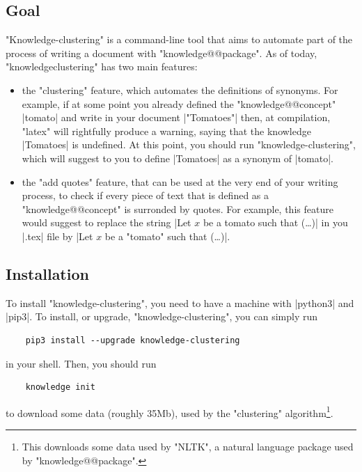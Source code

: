 \documentclass{article}
\begin{document}
\subsection{Goal}

"Knowledge-clustering" is a command-line tool that aims to automate part of
the process of writing a document with "knowledge@@package".
As of today, "knowledge\-clustering" has two main features:
\begin{itemize}
    \item the "clustering" feature, which automates the definitions
    of synonyms. For example,  if at some point you already defined the 
    "knowledge@@concept" \spverb|tomato| and write in your document
    \spverb|"Tomatoes"|
    then, at compilation, "latex" will rightfully produce a warning,
    saying that the knowledge \spverb|Tomatoes| is undefined.
    At this point, you should run "knowledge-clustering", which will suggest to 
    you to define \spverb|Tomatoes| as a synonym of \spverb|tomato|.
    \item the "add quotes" feature, that can be used at the very end of your 
    writing process, to check if every piece of text that is defined as
    a "knowledge@@concept" is surronded by quotes. For example, this feature 
    would suggest to replace the string \spverb|Let $x$ be a tomato such that (…)|
    in you \spverb|.tex| file by \spverb|Let $x$ be a "tomato" such that (…)|.
\end{itemize}

\subsection{Installation}

To install "knowledge-clustering", you need to have a machine with
\spverb|python3| and \spverb|pip3|. To install, or upgrade, "knowledge-clustering",
you can simply run
\begin{verbatim}
    pip3 install --upgrade knowledge-clustering
\end{verbatim}
in your shell.
Then, you should run
\begin{verbatim}
    knowledge init
\end{verbatim}
to download some data (roughly 35Mb), used by the "clustering" algorithm\footnote{This 
downloads some data used by "NLTK", a natural language package used by 
"knowledge@@package".}.
\end{document}

